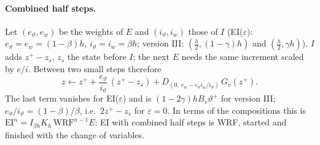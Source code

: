 \documentclass[11pt,a4paper]{article}
\newcommand{\tv}{\vartheta}   %
\begin{document}
\paragraph{Combined half steps.} Let $(e_\tv,e_w)$ be the weights of $E$ and $(i_\tv,i_w)$ those of $I$ (EI($\varepsilon$):
$e_\tv=e_w=(1-\beta)h$, $i_\tv=i_w=\beta h$; version III: $(\tfrac h2,(1-\gamma)h)$ and $(\tfrac h2,\gamma h)$). $I$ adds $z^+-z_s$, $z_s$ the
state before $I$; the next $E$ needs the same increment scaled by $e/i$. Between two small steps therefore
\[
z\leftarrow z^++\frac{e_\tv}{i_\tv}\,(z^+-z_s)+D_{(0,\ e_w-e_\tv i_w/i_\tv)}\,G_v(z^+) .
\]
The last term vanishes for EI($\varepsilon$) and is $(1-2\gamma)hB_v\tv^+$ for version III; $e_\tv/i_\tv=(1-\beta)/\beta$, i.e.\ $2z^+-z_s$ for
$\varepsilon=0$. In terms of the compositions this is $\text{EI}^n=I_{\beta h}K_h\,\text{WRF}^{n-1}E$: EI with combined half steps is WRF,
started and finished with the change of variables.
\end{document}
